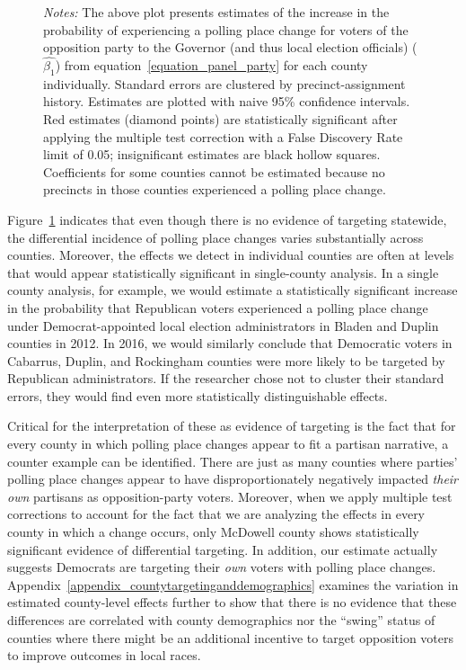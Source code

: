 \documentclass[12pt]{article}
\begin{document}
\begin{figure}[h!]
\begin{center}
		\label{county_panel_dem}
		\end{center}
	\scriptsize{\emph{Notes:}   The above plot presents estimates of the increase in the probability of experiencing a polling place change for voters of the opposition party to the Governor (and thus local election officials) ($\hat{\beta_{1}}$) from equation~\ref{equation_panel_party} for each county individually. Standard errors are clustered by precinct-assignment history. Estimates are plotted with naive 95\% confidence intervals. Red estimates (diamond points) are statistically significant after applying the \citet{Benjamini:2006gd} multiple test correction with a False Discovery Rate limit of 0.05; insignificant estimates are black hollow squares.  Coefficients for some counties cannot be estimated because no precincts in those counties experienced a polling place change.} \vspace*{.2in}
\end{figure} \normalsize

Figure~\ref{county_panel_dem} indicates that even though there is no evidence of targeting statewide, the differential incidence of polling place changes varies substantially across counties.  Moreover, the effects we detect in individual counties are often at levels that would appear statistically significant in single-county analysis.  In a single county analysis, for example, we would estimate a statistically significant increase in the probability that Republican voters experienced a polling place change under Democrat-appointed local election administrators in Bladen and Duplin counties in 2012. In 2016, we would similarly conclude that Democratic voters in Cabarrus, Duplin, and Rockingham counties were more likely to be targeted by Republican administrators.  If the researcher chose not to cluster their standard errors, they would find even more statistically distinguishable effects.

Critical for the interpretation of these as evidence of targeting is the fact that for every county in which polling place changes appear to fit a partisan narrative, a counter example can be identified.  There are just as many counties where parties' polling place changes appear to have disproportionately negatively impacted \emph{their own} partisans as opposition-party voters. Moreover, when we apply multiple test corrections to account for the fact that we are analyzing the effects in every county in which a change occurs, only McDowell county shows statistically significant evidence of differential targeting.  In addition, our estimate actually suggests Democrats are targeting their \emph{own} voters with polling place changes.  Appendix~\ref{appendix_countytargetinganddemographics} examines the variation in estimated county-level effects further to show that there is no evidence that these differences are correlated with county demographics nor the ``swing'' status of counties where there might be an additional incentive to target opposition voters to improve outcomes in local races.
\end{document}

